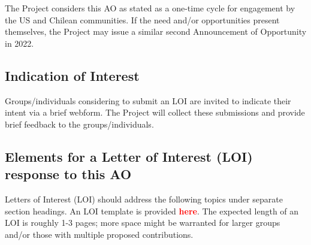 \documentclass[SE,authoryear,toc]{lsstdoc}
\newcommand{\FIXME}[1]{{\bf \textcolor{red}{#1}}}
\begin{document}
The Project considers this AO as stated as a one-time cycle for engagement by the US and Chilean communities. If the need and/or opportunities present themselves, the Project may issue a similar second Announcement of Opportunity in 2022. 

\subsection{Indication of Interest}

Groups/individuals considering to submit an LOI are invited to indicate their intent via a brief webform. The Project will collect these submissions and provide brief feedback to the groups/individuals. 

\subsection{Elements for a Letter of Interest (LOI) response to this AO}

Letters of Interest (LOI) should address the following topics under separate section headings. An LOI template is provided \FIXME{here}. The expected length of an LOI is roughly 1-3 pages; more space might be warranted for larger groups and/or those with multiple proposed contributions. 
\end{document}
